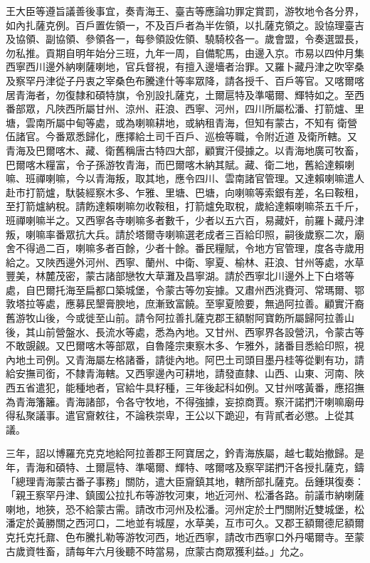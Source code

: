 \begin{pinyinscope}
王大臣等遵旨議善後事宜，奏青海王、臺吉等應論功罪定賞罰，游牧地令各分界，如內扎薩克例。百戶置佐領一，不及百戶者為半佐領，以扎薩克領之。設協理臺吉及協領、副協領、參領各一，每參領設佐領、驍騎校各一。歲會盟，令奏選盟長，勿私推。貢期自明年始分三班，九年一周，自備駝馬，由邊入京。市易以四仲月集西寧西川邊外納喇薩喇地，官兵督視，有擅入邊墻者治罪。又羅卜藏丹津之吹宰桑及察罕丹津從子丹衷之宰桑色布騰達什等率眾降，請各授千、百戶等官。又喀爾喀居青海者，勿復隸和碩特旗，令別設扎薩克，土爾扈特及準噶爾、輝特如之。至西番部眾，凡陜西所屬甘州、涼州、莊浪、西寧、河州，四川所屬松潘、打箭爐、里塘，雲南所屬中甸等處，或為喇嘛耕地，或納租青海，但知有蒙古，不知有衛營伍諸官。今番眾悉歸化，應擇給土司千百戶、巡檢等職，令附近道及衛所轄。又青海及巴爾喀木、藏、衛舊稱唐古特四大部，顧實汗侵據之。以青海地廣可牧畜，巴爾喀木糧富，令子孫游牧青海，而巴爾喀木納其賦。藏、衛二地，舊給達賴喇嘛、班禪喇嘛，今以青海叛，取其地，應令四川、雲南諸官管理。又達賴喇嘛遣人赴市打箭爐，馱裝經察木多、乍雅、里塘、巴塘，向喇嘛等索銀有差，名曰鞍租，至打箭爐納稅。請飭達賴喇嘛勿收鞍租，打箭爐免取稅，歲給達賴喇嘛茶五千斤，班禪喇嘛半之。又西寧各寺喇嘛多者數千，少者以五六百，易藏奸，前羅卜藏丹津叛，喇嘛率番眾抗大兵。請於塔爾寺喇嘛選老成者三百給印照，嗣後歲察二次，廟舍不得過二百，喇嘛多者百餘，少者十餘。番民糧賦，令地方官管理，度各寺歲用給之。又陜西邊外河州、西寧、蘭州、中衛、寧夏、榆林、莊浪、甘州等處，水草豐美，林麓茂密，蒙古諸部戀牧大草灘及昌寧湖。請於西寧北川邊外上下白塔等處，自巴爾托海至扁都口築城堡，令蒙古等勿妄據。又肅州西洮賚河、常瑪爾、鄂敦塔拉等處，應募民墾膏腴地，庶漸致富饒。至寧夏險要，無過阿拉善。顧實汗裔舊游牧山後，今或徙至山前。請令阿拉善扎薩克郡王額駙阿寶飭所屬歸阿拉善山後，其山前營盤水、長流水等處，悉為內地。又甘州、西寧界各設營汛，令蒙古等不敢覬覦。又巴爾喀木等部眾，自魯隆宗東察木多、乍雅外，諸番目悉給印照，視內地土司例。又青海屬左格諸番，請徙內地。阿巴土司頭目墨丹桂等從剿有功，請給安撫司銜，不隸青海轄。又西寧邊內可耕地，請發直隸、山西、山東、河南、陜西五省遣犯，能種地者，官給牛具籽種，三年後起科如例。又甘州喀黃番，應招撫為青海籓籬。青海諸部，令各守牧地，不得強據，妄掠商賈。察汗諾捫汗喇嘛廟毋得私聚議事。遣官齎敕往，不論秩崇卑，王公以下跪迎，有背貳者必懲。上從其議。

三年，詔以博羅充克克地給阿拉善郡王阿寶居之，鈐青海族屬，越七載始撤歸。是年，青海和碩特、土爾扈特、準噶爾、輝特、喀爾喀及察罕諾捫汗各授扎薩克，鑄「總理青海蒙古番子事務」關防，遣大臣齎鎮其地，轄所部扎薩克。岳鍾琪復奏：「親王察罕丹津、鎮國公拉扎布等游牧河東，地近河州、松潘各路。前議市納喇薩喇地，地狹，恐不給蒙古需。請改市河州及松潘。河州定於土門關附近雙城堡，松潘定於黃勝關之西河口，二地並有城屋，水草美，互市可久。又郡王額爾德尼額爾克托克托鼐、色布騰扎勒等游牧河西，地近西寧，請改市西寧口外丹噶爾寺。至蒙古歲資牲畜，請每年六月後聽不時當易，庶蒙古商眾獲利益。」允之。


\end{pinyinscope}
